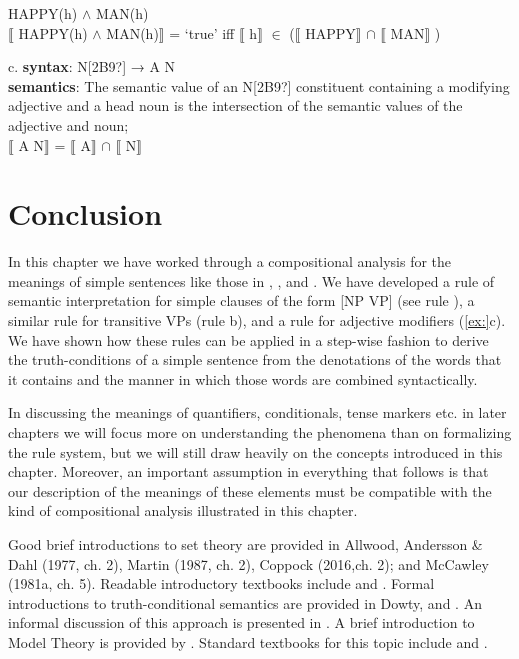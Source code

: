 \ea
\ea  HAPPY(h) $\wedge$ MAN(h)\\
\ex  $\llbracket$ HAPPY(h) $\wedge$ MAN(h)$\rrbracket$  = ‘true’  iff  $\llbracket$ h$\rrbracket$  ${\in}$ ($\llbracket$ HAPPY$\rrbracket$  ${\cap}$ $\llbracket$ MAN$\rrbracket$ )
                       \z
\z

\ea
  c.  \textbf{syntax}: N[2B9?]  →  A N\\
\textbf{semantics}: The semantic value of an N[2B9?] constituent containing a modifying adjective and a head noun is the intersection of the semantic values of the adjective and noun;\\
{}$\llbracket$ A N$\rrbracket$  =  $\llbracket$ A$\rrbracket$  ${\cap}$ $\llbracket$ N$\rrbracket$ 
\z

\section{Conclusion}\label{sec:} %

In this chapter we have worked through a compositional analysis for the meanings of simple sentences like those in , , and . We have developed a rule of semantic interpretation for simple clauses of the form [NP VP] (see rule ), a similar rule for transitive VPs (rule b), and a rule for adjective modifiers (\ref{ex:}c). We have shown how these rules can be applied in a step-wise fashion to derive the truth-conditions of a simple sentence from the denotations of the words that it contains and the manner in which those words are combined syntactically.



In discussing the meanings of quantifiers, conditionals, tense markers etc. in later chapters we will focus more on understanding the phenomena than on formalizing the rule system, but we will still draw heavily on the concepts introduced in this chapter. Moreover, an important assumption in everything that follows is that our description of the meanings of these elements must be compatible with the kind of compositional analysis illustrated in this chapter.



\furtherreading



Good brief introductions to set theory are provided in Allwood, Andersson \& Dahl (1977, ch. 2), Martin (1987, ch. 2), Coppock (2016,ch. 2); and McCawley (1981a, ch. 5). Readable introductory textbooks include \citet{Halmos1960} and \citet{Enderton1977}. Formal introductions to truth-conditional semantics are provided in Dowty, \citet{WallPeters1981} and \citet{HeimKratzer1998}. An informal discussion of this approach is presented in \citet{Bach1989}. A brief introduction to Model Theory is provided by \citet{Hodges2013}. Standard textbooks for this topic include \citet{ChangKeisler1990} and \citet{Hodges1997}.


